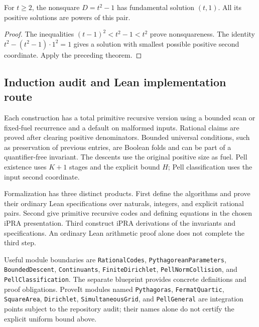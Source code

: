 \begin{corollary}\label{dio:pell-family}
For $t\geq2$, the nonsquare $D=t^2-1$ has fundamental solution
$(t,1)$. All its positive solutions are powers of this pair.
\end{corollary}
\begin{proof}
The inequalities $(t-1)^2<t^2-1<t^2$ prove nonsquareness.
The identity $t^2-(t^2-1)\cdot1^2=1$ gives a solution with smallest
possible positive second coordinate. Apply the preceding theorem.
\end{proof}

\subsection{Induction audit and Lean implementation route}

Each construction has a total primitive recursive version using a bounded
scan or fixed-fuel recurrence and a default on malformed inputs.
Rational claims are proved after clearing positive denominators.
Bounded universal conditions, such as preservation of previous entries,
are Boolean folds and can be part of a quantifier-free invariant.
The descents use the original positive size as fuel. Pell existence uses
$K+1$ stages and the explicit bound $H$; Pell classification uses the
input second coordinate.

Formalization has three distinct products. First define the algorithms
and prove their ordinary Lean specifications over naturals, integers, and
explicit rational pairs. Second give primitive recursive codes and
defining equations in the chosen iPRA presentation. Third construct
iPRA derivations of the invariants and specifications.
An ordinary Lean arithmetic proof alone does not complete the third step.

Useful module boundaries are \texttt{RationalCodes},
\texttt{PythagoreanParameters}, \texttt{BoundedDescent},
\texttt{Continuants}, \texttt{FiniteDirichlet},
\texttt{PellNormCollision}, and \texttt{PellClassification}.
The separate blueprint provides concrete definitions and proof obligations.
ProveIt modules named \texttt{Pythagoras}, \texttt{FermatQuartic},
\texttt{SquareArea}, \texttt{Dirichlet}, \texttt{SimultaneousGrid}, and
\texttt{PellGeneral} are integration points subject to the repository
audit; their names alone do not certify the explicit uniform bound above.
